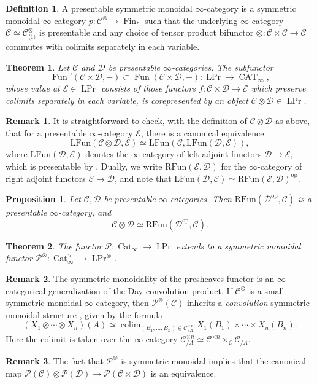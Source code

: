 \documentclass{article}
\newtheorem{theorem}{Theorem}[subsection]
\newtheorem{proposition}{Proposition}[subsection]
\theoremstyle{definition}
\newtheorem{definition}{Definition}[subsection]
\newtheorem{remark}{Remark}[subsection]
\newcommand{\C}{\mathcal{C}}
\newcommand{\D}{\mathcal{D}}
\newcommand{\E}{\mathcal{E}}
\renewcommand{\P}{\mathcal{P}}
\renewcommand{\i}{\infty}
\newcommand{\too}{\longrightarrow}
\newcommand{\op}{\mathrm{op}}
\DeclareMathOperator{\Cat}{Cat}
\DeclareMathOperator{\CAT}{CAT}
\DeclareMathOperator{\Fin}{Fin}
\DeclareMathOperator{\Fun}{Fun}
\newcommand{\Funl}{\mathrm{LFun}}
\newcommand{\Funr}{\mathrm{RFun}}
\DeclareMathOperator{\colim}{colim}
\DeclareMathOperator{\PrL}{LPr}
\DeclareMathOperator{\Prl}{LPr}
\begin{document}
\begin{definition}
A presentable symmetric monoidal $\infty$-category is a symmetric monoidal $\infty$-category $p:\C^\otimes\to\Fin_*$
such that the underlying $\infty$-category $\C\simeq\C^\otimes_{\langle 1\rangle}$ is presentable and any choice of tensor product bifunctor $\otimes:\C\times\C\to\C$ commutes with colimits separately in each variable.
\end{definition}
\begin{theorem}{\em \cite[Proposition 4.8.1.17]{HA}}
Let $\C$ and $\D$ be presentable $\infty$-categories.
The subfunctor
\[
\Fun'(\C\times\D,-)\subset\Fun(\C\times\D,-)\colon\Prl\too\CAT_\i,
\]
whose value at $\E\in\Prl$ consists of those functors $f:\C\times\D\to\E$ which preserve colimits separately in each variable, is corepresented by an object $\C\otimes\D\in\Prl$.
\end{theorem}
\begin{remark}
It is straightforward to check, with the definition of $\C\otimes\D$ as above, that for a presentable $\infty$-category $\E$, there is a canonical equivalence
\[
\Funl(\C\otimes\D,\E)\simeq\Funl(\C,\Funl(\D,\E)),
\]
where $\Funl(\D,\E)$
\index{$\Funl$}
denotes the $\infty$-category of left adjoint functors $\D\to\E$, which is presentable by \cite{HA}.
Dually, we write $\Funr(\E,\D)$
\index{$\Funr$}
for the $\infty$-category of right adjoint functors $\E\to\D$, and note that $\Funl(\D,\E)\simeq\Funr(\E,\D)^{\op}$.
\end{remark}
\begin{proposition}{\em \cite[Lemma 4.8.1.16]{HA}}
Let $\C,\D$ be presentable $\infty$-categories. Then $\Funr(\D^{\op},\C)$ is a presentable $\i$-category, and 
\[
\C\otimes\D\simeq\Funr(\D^{\op},\C).
\]
\end{proposition}


\begin{theorem}{\em \cite[Corollary 4.8.1.12]{HA}}
The functor $\P\colon\Cat_\i\to\PrL$ extends to a symmetric monoidal functor $\P^\otimes:\Cat_\i^{\times}\to\PrL^\otimes$.
\end{theorem}
\begin{remark}
The symmetric monoidality of the presheaves functor is an $\infty$-categorical generalization of the Day convolution product.
If $\C^\otimes$ is a small symmetric monoidal $\infty$-category, then $\P^\otimes(\C)$ inherits a {\em convolution} symmetric monoidal structure \cite[Remark 4.8.1.13]{HA}, given by the formula
\[
(X_1\otimes\cdots\otimes X_n)(A)\simeq\colim_{(B_1,\ldots,B_n)\in\C^{\times n}_{/A}} X_1(B_1)\times\cdots\times X_n(B_n).
\]
Here the colimit is taken over the $\infty$-category $\C^{\times n}_{/A}\simeq\C^{\times n}\times_\C \C_{/A}$.
\end{remark}
\begin{remark}
The fact that $\P^\otimes$ is symmetric monoidal implies that the canonical map $\P(\C)\otimes\P(\D)\to\P(\C\times\D)$ is an equivalence.
\end{remark}
\end{document}
